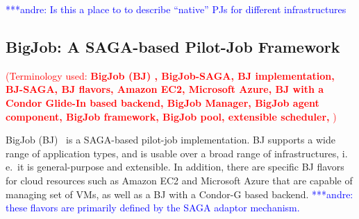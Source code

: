 \documentclass[conference,final]{IEEEtran}
\newcommand{\terminology}[1]{ {\textcolor{red} {(Terminology used: \textbf{#1}) }}}
\newcommand{\jhanote}[1]{ {\textcolor{red} { ***shantenu: #1 }}}
\newcommand{\alnote}[1]{ {\textcolor{blue} { ***andre: #1 }}}
\newcommand{\terminology}[1]{}
\newcommand{\alnote}[1]{}
\newcommand{\jhanote}[1]{}
\newcommand{\upp}{\vspace*{-0.5em}}
\begin{document}
\alnote{Is this a place to to describe ``native'' PJs for different 
infrastructures}

\subsection{BigJob: A SAGA-based Pilot-Job Framework\upp\upp}
\label{sec:bigjob_description}
\terminology{BigJob (BJ) , BigJob-SAGA, BJ implementation,  BJ-SAGA, BJ flavors, Amazon EC2, Microsoft Azure,
 BJ with a Condor Glide-In based backend,  BigJob Manager, BigJob agent component, BigJob framework,
 BigJob pool, extensible scheduler, } 









BigJob (BJ)~\cite{bigjob_web,saga_bigjob_condor_cloud} is a SAGA-based pilot-job
implementation. BJ supports a wide range of application types, and is usable
over a broad range of infrastructures, i.\,e.\ it is general-purpose and
extensible. In addition, there are specific BJ flavors for cloud resources such
as Amazon EC2 and Microsoft Azure that are capable of managing set of VMs, as
well as a BJ with a Condor-G based backend. \alnote{these flavors are primarily 
defined by the SAGA adaptor mechanism.}
\end{document}
